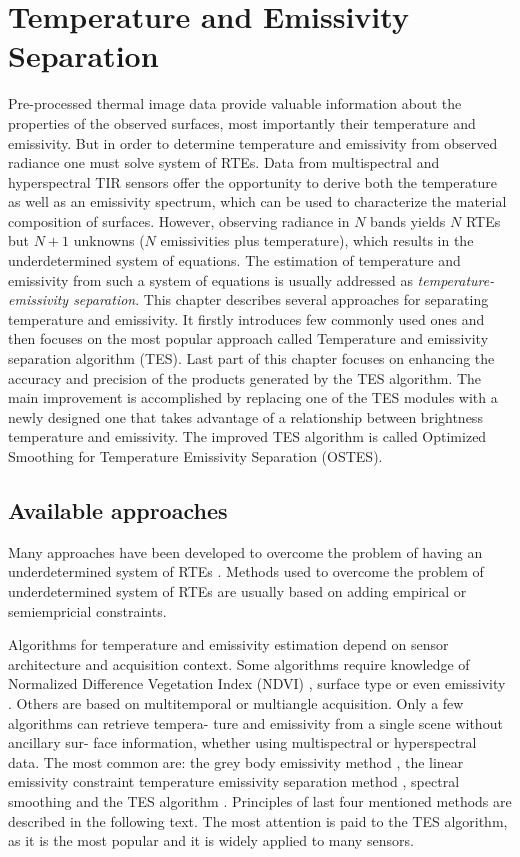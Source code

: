 \chapter{Temperature and Emissivity Separation}
\label{chap:TES}

Pre-processed thermal image data provide valuable information about the properties of the observed surfaces, most importantly their temperature and emissivity. But in order to determine temperature and emissivity from observed radiance one must solve system of RTEs. Data from multispectral and hyperspectral TIR sensors offer the opportunity to derive both the temperature as well as an emissivity spectrum, which can be used to characterize the material composition of surfaces. However, observing radiance in $N$ bands yields $N$ RTEs but $N+1$ unknowns ($N$ emissivities plus temperature), which results in the underdetermined system of equations. The estimation of temperature and emissivity from such a system of equations is usually addressed as \textit{temperature-emissivity separation}. This chapter describes several approaches for separating temperature and emissivity. It firstly introduces few commonly used ones and then focuses on the most popular approach called Temperature and emissivity separation algorithm (TES). Last part of this chapter focuses on enhancing the accuracy and precision of the products generated by the TES algorithm. The main improvement is accomplished by replacing one of the TES modules with a newly designed one that takes advantage of a relationship between brightness temperature and emissivity. The improved TES algorithm is called Optimized Smoothing for Temperature Emissivity Separation (OSTES).

\section{Available approaches}

Many approaches have been developed to overcome the problem of having an underdetermined system of RTEs \cite{LT13}. Methods used to overcome the problem of underdetermined system of RTEs are usually based on adding empirical or semiempricial constraints. 

Algorithms for temperature and emissivity estimation depend on sensor architecture and acquisition context. Some algorithms require knowledge of Normalized Difference Vegetation Index (NDVI) \cite{SR00}, surface type \cite{SW98} or even emissivity \cite{JC09}. Others are based on multitemporal \cite{W08} or multiangle \cite{SS07} acquisition. Only a few algorithms can retrieve tempera- ture and emissivity from a single scene without ancillary sur- face information, whether using multispectral or hyperspectral data. The most common are: the grey body emissivity method \cite{BP96}, the linear emissivity constraint temperature emissivity separation method \cite{WW11}, spectral smoothing \cite{B08} and the TES algorithm \cite{GR98}. Principles of last four mentioned methods are described in the following text. The most attention is paid to the TES algorithm, as it is the most popular and it is widely applied to many sensors.

